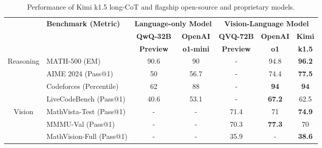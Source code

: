 \begin{table}[h]
    \centering
    \begin{tabular}{@{}c l | c c | c c c@{}}
    \toprule
    & \multirow{3}{*}{\centering \textbf{Benchmark {\tiny (Metric)}}} 
    & \multicolumn{2}{c|}{\textbf{Language-only Model}} 
    & \multicolumn{3}{c}{\textbf{Vision-Language Model}} \\ 
    & & \textbf{QwQ-32B} & \textbf{OpenAI} & \textbf{QVQ-72B} & \textbf{OpenAI} & \textbf{Kimi} \\
    & & \textbf{Preview} & \textbf{o1-mini} & \textbf{Preview} & \textbf{o1} & \textbf{k1.5}  \\
    \midrule
    
    \multirow{4}{*}{Reasoning}
    & MATH-500 {\tiny (EM)} & 90.6 & 90 & - & 94.8 & \textbf{96.2} \\
    & AIME 2024 {\tiny (Pass@1)} & 50 & 56.7 & - & 74.4 & \textbf{77.5} \\
    & Codeforces {\tiny (Percentile)} & 62 & 88 & - & \textbf{94} & \textbf{94} \\
    & LiveCodeBench  {\tiny (Pass@1)} & 40.6 & 53.1 & - & \textbf{67.2} & 62.5 \\
    \midrule
    
    \multirow{3}{*}{Vision} 
    & MathVista-Test {\tiny (Pass@1)} & - & - & 71.4 & 71 & \textbf{74.9} \\
    & MMMU-Val {\tiny (Pass@1)} & - & - & 70.3 & \textbf{77.3} & 70 \\
    & MathVision-Full {\tiny (Pass@1)} & - & - & 35.9 & - & \textbf{38.6} \\
 
    \bottomrule
    \end{tabular}
    \caption{Performance of Kimi k1.5 long-CoT and  flagship open-source and proprietary models.}
    \label{tab:long_perf}
\end{table}